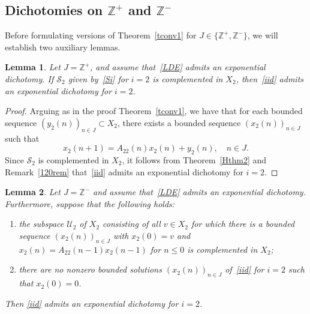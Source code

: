 \documentclass[11pt,reqno,a4paper]{amsart}
\theoremstyle{plain}
\numberwithin{equation}{section}
\newtheorem{lemma}{Lemma}
\theoremstyle{remark}
\newtheorem{remark}{Remark}
\def\Z{\mathbb{Z}}
\begin{document}
\subsection{Dichotomies on $\Z^+$ and $\Z^-$}
Before formulating versions of Theorem~\ref{tconv1} for $J\in \{\Z^+, \Z^-\}$, we will establish two auxiliary lemmas.

\begin{lemma}\label{diciid2}
Let $J=\Z^+$, and assume that~\eqref{LDE} admits an exponential dichotomy. If $\mathcal S_2$ given by~\eqref{Si} for $i=2$ is complemented in $X_2$, then~\eqref{iid} admits an exponential dichotomy for $i=2$.
\end{lemma}

\begin{proof} Arguing as in the proof Theorem~\ref{tconv1}, we have that for each bounded sequence $(y_2(n))_{n\in J}\subset X_2$, there exists a bounded sequence $(x_2(n))_{n\in J}$ such that 
\[
x_2(n+1)=A_{22}(n)x_2(n)+y_2(n), \quad n\in J.
\]
Since $\mathcal S_2$ is complemented in $X_2$, it follows from Theorem~\ref{Hthm2} and Remark~\ref{120rem} that~\eqref{iid} admits an exponential dichotomy for $i=2$.
\end{proof}

\begin{lemma}\label{neglin}
Let $J=\Z^-$ and assume that~\eqref{LDE} admits an exponential dichotomy. Furthermore, suppose that the following holds:
\begin{enumerate}
\item the subspace $\mathcal U_2$ of $X_2$ consisting of all $v\in X_2$ for which there is a bounded sequence $(x_2(n))_{n\in J}$ with $x_2(0)=v$ and $x_2(n)=A_{22}(n-1)x_2(n-1)$ for $n\le 0$ is complemented in $X_2$;
\item there are no nonzero bounded solutions $(x_2(n))_{n\in J}$ of~\eqref{iid} for $i=2$ such that $x_2(0)=0$.
\end{enumerate}
Then \eqref{iid} admits an exponential dichotomy for $i=2$.

\end{lemma}
\end{document}
